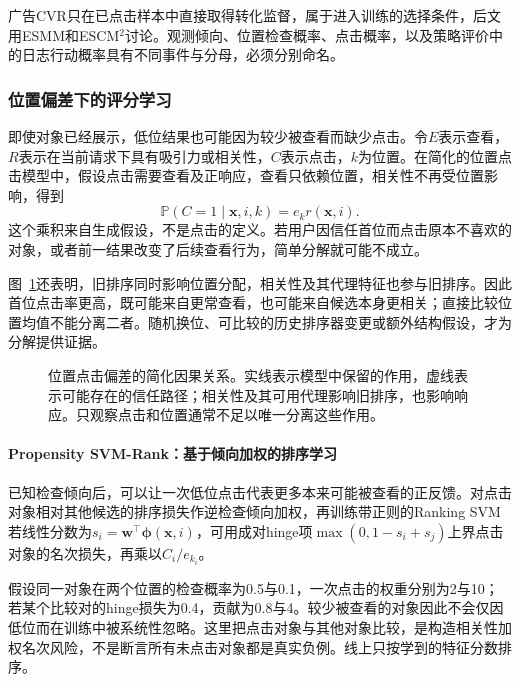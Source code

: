 广告CVR只在已点击样本中直接取得转化监督，属于进入训练的选择条件，后文用ESMM和ESCM$^2$讨论。观测倾向、位置检查概率、点击概率，以及策略评价中的日志行动概率具有不同事件与分母，必须分别命名。

\subsubsection{位置偏差下的评分学习}
\label{sec:rs-position-bias}

即使对象已经展示，低位结果也可能因为较少被查看而缺少点击。令$E$表示查看，$R$表示在当前请求下具有吸引力或相关性，$C$表示点击，$k$为位置。在简化的位置点击模型中，假设点击需要查看及正响应，查看只依赖位置，相关性不再受位置影响，得到
\begin{equation}
 \mathbb P(C=1\mid\bm x,i,k)=e_k r(\bm x,i).
 \label{eq:rs-pbm}
\end{equation}
这个乘积来自生成假设，不是点击的定义。若用户因信任首位而点击原本不喜欢的对象，或者前一结果改变了后续查看行为，简单分解就可能不成立。

图~\ref{fig:rs-position-paths}还表明，旧排序同时影响位置分配，相关性及其代理特征也参与旧排序。因此首位点击率更高，既可能来自更常查看，也可能来自候选本身更相关；直接比较位置均值不能分离二者。随机换位、可比较的历史排序器变更或额外结构假设，才为分解提供证据。
\begin{figure}[htbp]
 \centering
 
 \caption{位置点击偏差的简化因果关系。实线表示模型中保留的作用，虚线表示可能存在的信任路径；相关性及其可用代理影响旧排序，也影响响应。只观察点击和位置通常不足以唯一分离这些作用。}
 \label{fig:rs-position-paths}
\end{figure}

\paragraph{Propensity SVM-Rank：基于倾向加权的排序学习}
\label{sec:rs-propensity-svm}

已知检查倾向后，可以让一次低位点击代表更多本来可能被查看的正反馈。对点击对象相对其他候选的排序损失作逆检查倾向加权，再训练带正则的Ranking SVM若线性分数为$s_i=\bm w^\top\bm\phi(\bm x,i)$，可用成对hinge项$\max(0,1-s_i+s_j)$上界点击对象的名次损失，再乘以$C_i/e_{k_i}$。

假设同一对象在两个位置的检查概率为0.5与0.1，一次点击的权重分别为2与10；若某个比较对的hinge损失为0.4，贡献为0.8与4。较少被查看的对象因此不会仅因低位而在训练中被系统性忽略。这里把点击对象与其他对象比较，是构造相关性加权名次风险，不是断言所有未点击对象都是真实负例。线上只按学到的特征分数排序。

